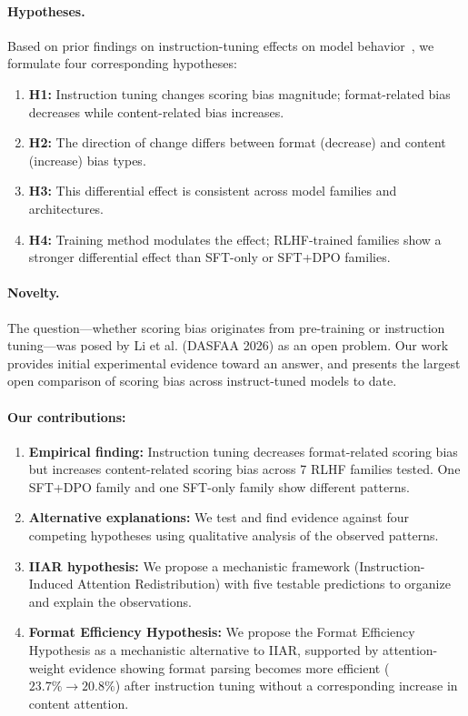 \documentclass[11pt,preprint,nonatbib]{article}
\begin{document}
\paragraph{Hypotheses.} Based on prior findings on instruction-tuning effects on model behavior~\cite{pan2025user,thakur2024judging}, we formulate four corresponding hypotheses:
\begin{enumerate}
    \item \textbf{H1:} Instruction tuning changes scoring bias magnitude; format-related bias decreases while content-related bias increases.
    \item \textbf{H2:} The direction of change differs between format (decrease) and content (increase) bias types.
    \item \textbf{H3:} This differential effect is consistent across model families and architectures.
    \item \textbf{H4:} Training method modulates the effect; RLHF-trained families show a stronger differential effect than SFT-only or SFT+DPO families.
\end{enumerate}

\paragraph{Novelty.} The question---whether scoring bias originates from pre-training or instruction tuning---was posed by Li et al. (DASFAA 2026) as an open problem. Our work provides initial experimental evidence toward an answer, and presents the largest open comparison of scoring bias across instruct-tuned models to date.

\paragraph{Our contributions:}
\begin{enumerate}
    \item \textbf{Empirical finding:} Instruction tuning decreases format-related scoring bias but increases content-related scoring bias across 7 RLHF families tested. One SFT+DPO family and one SFT-only family show different patterns.
    \item \textbf{Alternative explanations:} We test and find evidence against four competing hypotheses using qualitative analysis of the observed patterns.
    \item \textbf{IIAR hypothesis:} We propose a mechanistic framework (Instruction-Induced Attention Redistribution) with five testable predictions to organize and explain the observations.
    \item \textbf{Format Efficiency Hypothesis:} We propose the Format Efficiency Hypothesis as a mechanistic alternative to IIAR, supported by attention-weight evidence showing format parsing becomes more efficient ($23.7\% \to 20.8\%$) after instruction tuning without a corresponding increase in content attention.
\end{enumerate}
\end{document}
